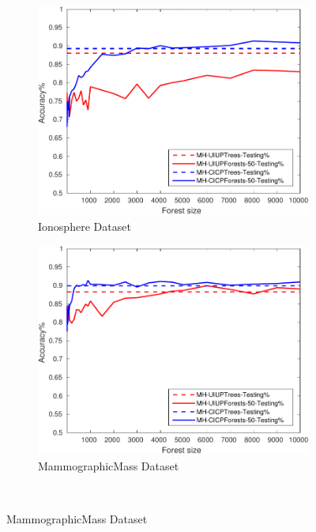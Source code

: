 \begin{figure}[ht]
\begin{subfigure}[b]{0.3\textwidth}
		\label{fig:G4}
	\end{subfigure}
  \begin{subfigure}[b]{0.3\textwidth}
		\centering
  	\includegraphics[width=\textwidth]{figs/PLPTF/Forests/IonosphereDownsampledFurther_Forests_MH.pdf}
  	\caption{Ionosphere Dataset}
		\label{fig:I4}
	\end{subfigure}
  \begin{subfigure}[b]{0.3\textwidth}
		\centering
  	\includegraphics[width=\textwidth]{figs/PLPTF/Forests/MammographicMassDownsampled_Forests_MH.pdf}
  	\caption{MammographicMass Dataset}
		\label{fig:Mam4}
	\end{subfigure}
	\\

\end{figure}
